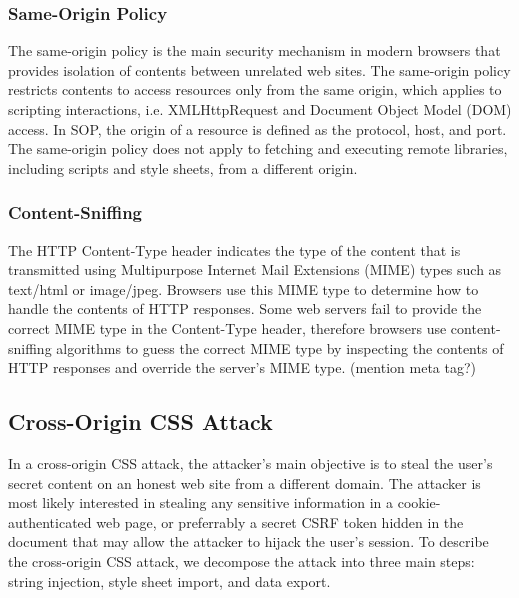 \documentclass{acm_proc_article-sp}
\begin{document}
\subsubsection{Same-Origin Policy}
The same-origin policy\cite{mozillasameorigin} is the main security mechanism in modern browsers that provides isolation of contents between unrelated web sites. The same-origin policy restricts contents to access resources only from the same origin, which applies to scripting interactions, i.e. XMLHttpRequest and Document Object Model (DOM)\cite{dom} access. In SOP, the origin of a resource is defined as the protocol, host, and port. The same-origin policy does not apply to fetching and executing remote libraries, including scripts and style sheets, from a different origin.

\subsubsection{Content-Sniffing}
The HTTP Content-Type header indicates the type of the content that is transmitted using Multipurpose Internet Mail Extensions (MIME)\cite{mime} types such as text/html or image/jpeg. Browsers use this MIME type to determine how to handle the contents of HTTP responses. Some web servers fail to provide the correct MIME type in the Content-Type header, therefore browsers use content-sniffing algorithms to guess the correct MIME type by inspecting the contents of HTTP responses and override the server's MIME type.
(mention meta tag?)

\subsection{Cross-Origin CSS Attack}
In a cross-origin CSS attack, the attacker's main objective is to steal the user's secret content on an honest web site from a different domain. The attacker is most likely interested in stealing any sensitive information in a cookie-authenticated web page, or preferrably a secret CSRF token\cite{csrf} hidden in the document that may allow the attacker to hijack the user's session. To describe the cross-origin CSS attack, we decompose the attack into three main steps: string injection, style sheet import, and data export.
\end{document}
